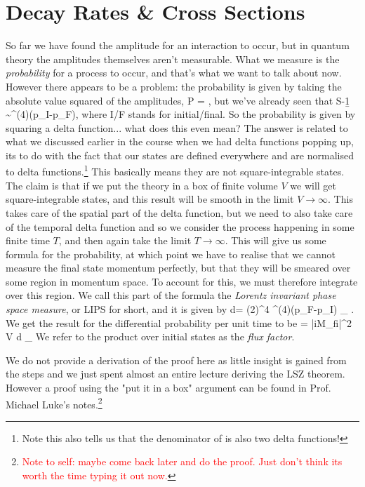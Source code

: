 \section{Decay Rates \& Cross Sections}

So far we have found the amplitude for an interaction to occur, but in quantum theory the amplitudes themselves aren't measurable. What we measure is the \textit{probability} for a process to occur, and that's what we want to talk about now. However there appears to be a problem: the probability is given by taking the absolute value squared of the amplitudes, 
\be 
\label{eqn:Probability}
    P = ,
\ee 
but we've already seen that 
\bse 
    S-\b1 \sim \del^{(4)}(p_I-p_F),
\ese 
where I/F stands for initial/final. So the probability is given by squaring a delta function... what does this even mean? The answer is related to what we discussed earlier in the course when we had delta functions popping up, its to do with the fact that our states are defined everywhere and are normalised to delta functions.\footnote{Note this also tells us that the denominator of  is also two delta functions!} This basically means they are not square-integrable states. The claim is that if we put the theory in a box of finite volume $V$ we will get square-integrable states, and this result will be smooth in the limit $V\to \infty$. This takes care of the spatial part of the delta function, but we need to also take care of the temporal delta function and so we consider the process happening in some finite time $T$, and then again take the limit $T\to \infty$. This will give us some formula for the probability, at which point we have to realise that we cannot measure the final state momentum perfectly, but that they will be smeared over some region in momentum space. To account for this, we must therefore integrate over this region. We call this part of the formula the \textit{Lorentz invariant phase space measure}, or LIPS for short, and it is given by 
\be 
\label{eqn:LIPS}
    d\Pi = (2\pi)^4 \del^{(4)}(p_F-p_I) \prod_{}  .
\ee 
We get the result for the differential probability per unit time to be 
\be 
\label{eqn:DifferentialPropbability}
     = |iM_{fi}|^2 V d \Pi \prod_{} 
\ee 
We refer to the product over initial states as the \textit{flux factor}.

We do not provide a derivation of the proof here as little insight is gained from the steps and we just spent almost an entire lecture deriving the LSZ theorem. However a proof using the "put it in a box" argument can be found in Prof. Michael Luke's notes.\footnote{\textcolor{red}{Note to self: maybe come back later and do the proof. Just don't think its worth the time typing it out now.}}

